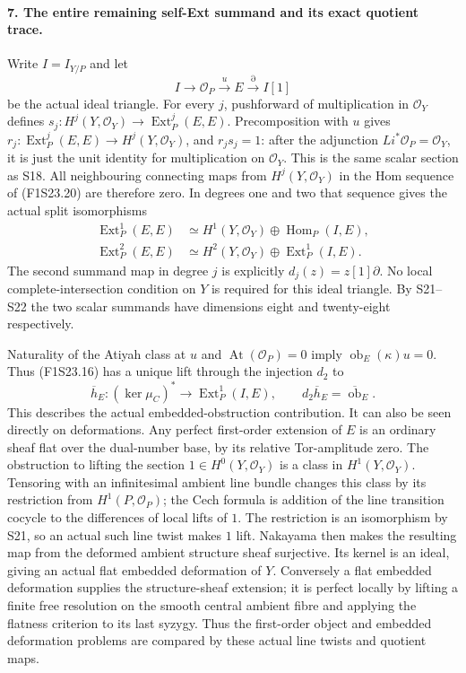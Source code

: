 \paragraph{7. The entire remaining self-Ext summand and its exact quotient trace.}
Write $I=I_{Y/P}$ and let
\[
 I\longrightarrow\mathcal O_P\xrightarrow{u}E
                   \xrightarrow{\partial}I[1]
 \tag{F1S23.20}
\]
be the actual ideal triangle. For every $j$, pushforward of
multiplication in $\mathcal O_Y$ defines
$s_j:H^j(Y,\mathcal O_Y)\to\operatorname{Ext}^j_P(E,E)$.
Precomposition with $u$ gives
$r_j:\operatorname{Ext}^j_P(E,E)\to H^j(Y,\mathcal O_Y)$,
and $r_js_j=1$: after the adjunction
$Li^*\mathcal O_P=\mathcal O_Y$, it is just the unit identity
for multiplication on $\mathcal O_Y$. This is the same scalar
section as S18. All neighbouring connecting maps from
$H^j(Y,\mathcal O_Y)$ in the Hom sequence of (F1S23.20)
are therefore zero. In degrees one and two that sequence gives
the actual split isomorphisms
\[
 \begin{split}
 \operatorname{Ext}^1_P(E,E)&\simeq
       H^1(Y,\mathcal O_Y)\oplus\operatorname{Hom}_P(I,E),\\
 \operatorname{Ext}^2_P(E,E)&\simeq
       H^2(Y,\mathcal O_Y)\oplus\operatorname{Ext}^1_P(I,E).
 \end{split}
 \tag{F1S23.21}
\]
The second summand map in degree $j$ is explicitly
$d_j(z)=z[1]\partial$. No local complete-intersection
condition on $Y$ is required for this ideal triangle.
By S21--S22 the two scalar summands have dimensions eight
and twenty-eight respectively.

Naturality of the Atiyah class at $u$ and
$\operatorname{At}(\mathcal O_P)=0$ imply
$\operatorname{ob}_E(\kappa)u=0$. Thus (F1S23.16)
has a unique lift through the injection $d_2$ to
\[
 \overline h_E:(\ker\mu_C)^*\longrightarrow
                              \operatorname{Ext}^1_P(I,E),
 \qquad d_2\overline h_E=\overline{\operatorname{ob}}_E.
 \tag{F1S23.22}
\]
This describes the actual embedded-obstruction contribution.
It can also be seen directly on deformations. Any perfect
first-order extension of $E$ is an ordinary sheaf flat over
the dual-number base, by its relative Tor-amplitude zero.
The obstruction to lifting the section $1\in H^0(Y,\mathcal O_Y)$
is a class in $H^1(Y,\mathcal O_Y)$. Tensoring with an
infinitesimal ambient line bundle changes this class by its
restriction from $H^1(P,\mathcal O_P)$; the Cech formula is
addition of the line transition cocycle to the differences of
local lifts of $1$. The restriction is an isomorphism by S21,
so an actual such line twist makes $1$ lift. Nakayama then
makes the resulting map from the deformed ambient structure
sheaf surjective. Its kernel is an ideal, giving an actual
flat embedded deformation of $Y$. Conversely a flat embedded
deformation supplies the structure-sheaf extension; it is
perfect locally by lifting a finite free resolution on the
smooth central ambient fibre and applying the flatness
criterion to its last syzygy. Thus the first-order object and
embedded deformation problems are compared by these actual
line twists and quotient maps.

